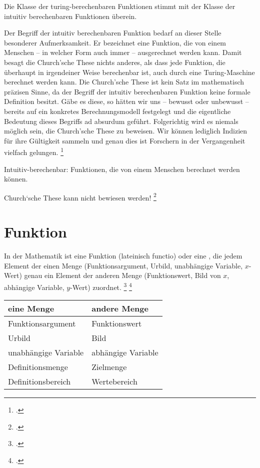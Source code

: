 \documentclass{lehramt-informatik-haupt}
\begin{document}
Die Klasse der turing-berechenbaren Funktionen stimmt mit der
Klasse der intuitiv berechenbaren Funktionen überein.

Der Begriff der intuitiv berechenbaren Funktion bedarf an dieser Stelle
besonderer Aufmerksamkeit. Er bezeichnet eine Funktion, die von einem
Menschen – in welcher Form auch immer – ausgerechnet werden kann. Damit
besagt die Church’sche These nichts anderes, als dass jede Funktion,
die überhaupt in irgendeiner Weise berechenbar ist, auch durch eine
Turing-Maschine berechnet werden kann. Die Church’sche These ist kein
Satz im mathematisch präzisen Sinne, da der Begriff der intuitiv
berechenbaren Funktion keine formale Definition besitzt. Gäbe es
diese, so hätten wir uns – bewusst oder unbewusst – bereits auf ein
konkretes Berechnungsmodell festgelegt und die eigentliche Bedeutung
dieses Begriffs ad absurdum geführt. Folgerichtig wird es niemals
möglich sein, die Church’sche These zu beweisen. Wir können lediglich
Indizien für ihre Gültigkeit sammeln und genau dies ist Forschern in der
Vergangenheit vielfach gelungen.
\footcite[Seite 308]{hoffmann}

Intuitiv-berechenbar:
Funktionen, die von einem Menschen berechnet werden können.

Church‘sche These kann nicht bewiesen werden!
\footcite[Seite 27]{theo:fs:4}

\section{Funktion}

In der Mathematik ist eine Funktion (lateinisch functio) oder
 eine , die jedem Element der einen Menge (Funktionsargument, Urbild,
unabhängige Variable, $x$-Wert) genau ein Element der anderen Menge
(Funktionswert, Bild von $x$, abhängige Variable, $y$-Wert) zuordnet.
\footcite[Seite 51]{hoffmann}
\footcite{wiki:funktion}

\begin{center}
\begin{tabular}{l|l}
eine Menge & andere Menge\\\hline
Funktionsargument & Funktionswert\\
Urbild & Bild\\
unabhängige Variable & abhängige Variable\\
Definitionsmenge & Zielmenge\\
Definitionsbereich & Wertebereich\\
\end{tabular}
\end{center}
\end{document}
